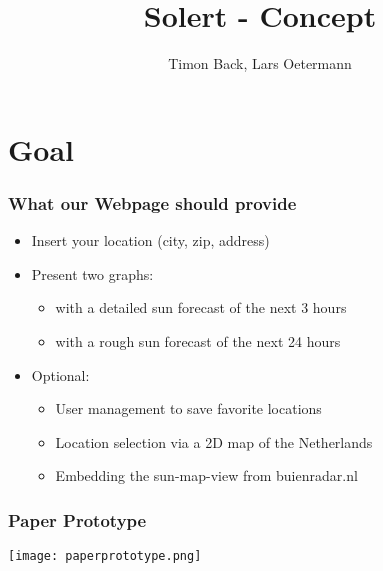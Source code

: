 \documentclass{beamer}
\title{Solert - Concept}
\author{Timon Back, Lars Oetermann}
\date[]{}
\begin{document}
\frame{\titlepage}

\section{Goal}
\frame
{
\frametitle{What our Webpage should provide}
  \begin{itemize}
   \item Insert your location (city, zip, address)
   \item Present two graphs:
      \begin{itemize} 
	\item with a detailed sun forecast of the next 3 hours
	\item with a rough sun forecast of the next 24 hours
	\end{itemize}
    \item Optional:
      \begin{itemize}
       \item User management to save favorite locations
       \item Location selection via a 2D map of the Netherlands
       \item Embedding the sun-map-view from buienradar.nl
      \end{itemize}

  \end{itemize}

}

\begin{frame}
 
 \frametitle{Paper Prototype}
 \begin{center}
   \texttt{[image: paperprototype.png]}
 \end{center}

\end{frame}
\end{document}
